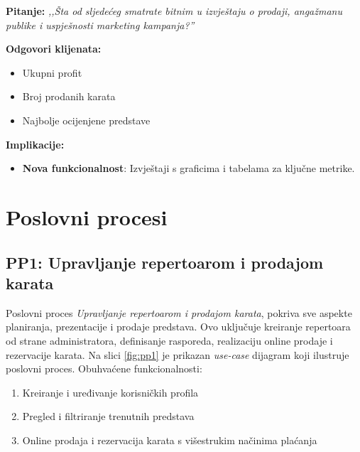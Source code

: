 \textbf{Pitanje:}  
\emph{,,Šta od sljedećeg smatrate bitnim u izvještaju o prodaji, angažmanu publike i uspješnosti marketing kampanja?''}  

\textbf{Odgovori klijenata:}  
\begin{itemize}  
    \item Ukupni profit  
    \item Broj prodanih karata  
    \item Najbolje ocijenjene predstave  
\end{itemize}  

\textbf{Implikacije:}  
\begin{itemize}  
    \item \textbf{Nova funkcionalnost}: Izvještaji s graficima i tabelama za ključne metrike.  
\end{itemize}  

\sloppy
\section{Poslovni procesi}

\sloppy
\subsection{PP1: Upravljanje repertoarom i prodajom karata}

Poslovni proces \textit{Upravljanje repertoarom i prodajom karata}, pokriva sve aspekte planiranja, prezentacije i prodaje predstava. Ovo uključuje kreiranje repertoara od strane administratora, definisanje rasporeda, realizaciju online prodaje i rezervacije karata. Na slici \ref{fig:pp1} je prikazan \textit{use-case} dijagram koji ilustruje poslovni proces. Obuhvaćene funkcionalnosti:

\begin{enumerate}
    \item Kreiranje i uređivanje korisničkih profila 
    \item Pregled i filtriranje trenutnih predstava 
    \item Online prodaja i rezervacija karata s višestrukim načinima plaćanja

\end{enumerate}

